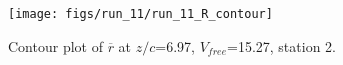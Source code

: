 \begin{figure}[H]
\centering
\texttt{[image: figs/run\_11/run\_11\_R\_contour]}
\caption{Contour plot of $\overline{r}$ at $z/c$=6.97, $V_{free}$=15.27, station 2.}
\label{fig:run_11_R_contour}
\end{figure}


